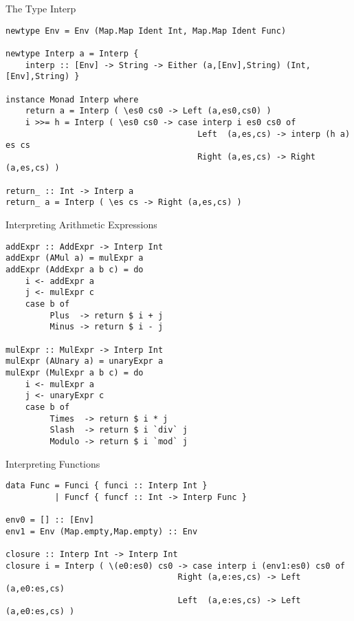 \documentclass[12pt]{beamer}
\newcommand{\codesize}{\fontsize{7.7}{7.7}}
\begin{document}
\begin{spacing}{1.3}
\begin{frame}[fragile=singleslide]{The Type Interp}
\begin{verbatim}
newtype Env = Env (Map.Map Ident Int, Map.Map Ident Func)

newtype Interp a = Interp {
    interp :: [Env] -> String -> Either (a,[Env],String) (Int,[Env],String) }

instance Monad Interp where
    return a = Interp ( \es0 cs0 -> Left (a,es0,cs0) )
    i >>= h = Interp ( \es0 cs0 -> case interp i es0 cs0 of
                                       Left  (a,es,cs) -> interp (h a) es cs
                                       Right (a,es,cs) -> Right  (a,es,cs) )
                                       
return_ :: Int -> Interp a
return_ a = Interp ( \es cs -> Right (a,es,cs) )
\end{verbatim}
\end{frame}

\begin{frame}[fragile=singleslide]{Interpreting Arithmetic Expressions}
\begin{verbatim}
addExpr :: AddExpr -> Interp Int
addExpr (AMul a) = mulExpr a
addExpr (AddExpr a b c) = do
    i <- addExpr a
    j <- mulExpr c
    case b of
         Plus  -> return $ i + j
         Minus -> return $ i - j

mulExpr :: MulExpr -> Interp Int
mulExpr (AUnary a) = unaryExpr a
mulExpr (MulExpr a b c) = do
    i <- mulExpr a
    j <- unaryExpr c
    case b of
         Times  -> return $ i * j
         Slash  -> return $ i `div` j
         Modulo -> return $ i `mod` j
\end{verbatim}
\end{frame}

\begin{frame}[fragile=singleslide]{Interpreting Functions}
\begin{verbatim}
data Func = Funci { funci :: Interp Int }
          | Funcf { funcf :: Int -> Interp Func }

env0 = [] :: [Env]
env1 = Env (Map.empty,Map.empty) :: Env

closure :: Interp Int -> Interp Int
closure i = Interp ( \(e0:es0) cs0 -> case interp i (env1:es0) cs0 of
                                   Right (a,e:es,cs) -> Left (a,e0:es,cs)
                                   Left  (a,e:es,cs) -> Left (a,e0:es,cs) )
                  

\end{verbatim}
\end{frame}
\end{spacing}
\end{document}
